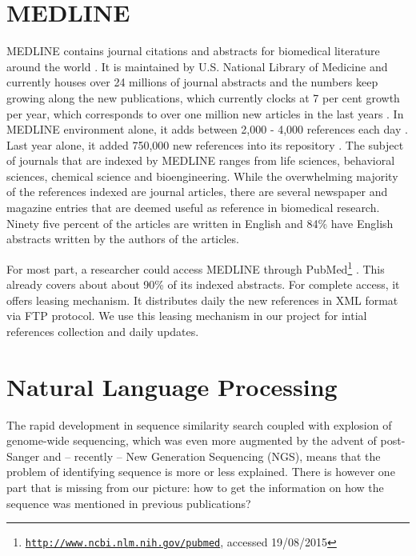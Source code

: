 
\section{MEDLINE}

MEDLINE contains journal citations and abstracts for biomedical literature around the world \citep{MEDLINE}. It is maintained by U.S. National Library of Medicine and currently houses over 24 millions of journal abstracts and the numbers keep growing along the new publications, which currently clocks at 7 per cent growth per year, which corresponds to over one million new articles in the last years \citep{larsen2010rate}. In MEDLINE environment alone, it adds between 2,000 - 4,000 references each day \citep{MEDLINE}. Last year alone, it added 750,000 new references into its repository \citep{MEDLINE}. The subject of journals that are indexed by MEDLINE ranges from life sciences, behavioral sciences, chemical science and bioengineering. While the overwhelming majority of the references indexed are journal articles, there are several newspaper and magazine entries that are deemed useful as reference in biomedical research. Ninety five percent of the articles are written in English and 84\% have English abstracts written by the authors of the articles.

For most part, a researcher could access MEDLINE through PubMed\footnote{\href{http://www.ncbi.nlm.nih.gov/pubmed}{\texttt{http://www.ncbi.nlm.nih.gov/pubmed}}, accessed 19/08/2015} \citep{MELDINEWeb}. This already covers about about 90\% of its indexed abstracts. For complete access, it offers leasing mechanism. It distributes daily the new references in XML format via FTP protocol. We use this leasing mechanism in our project for intial references collection and daily updates.


\section{Natural Language Processing}

The rapid development in sequence similarity search coupled with explosion of genome-wide sequencing, which was even more augmented by the advent of post-Sanger and -- recently -- New Generation Sequencing (NGS), means that the problem of identifying sequence is more or less explained. There is however one part that is missing from our picture: how to get the information on how the sequence was mentioned in previous publications?


